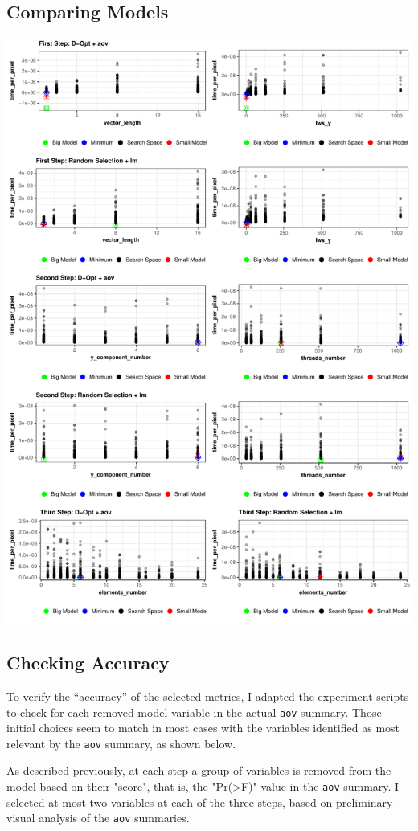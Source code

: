 \documentclass[final,12pt,a4paper]{article}
\begin{document}
\subsection{Comparing Models}
\label{sec:org64c6ae3}
\begin{center}
\includegraphics[width=.9\linewidth]{../img/model_comparison.pdf}
\end{center}
\subsection{Checking Accuracy}
\label{sec:orgc01bc39}
To verify the ``accuracy'' of the selected metrics, I adapted the experiment
scripts to check for each removed model variable in the actual \texttt{aov} summary.
Those initial choices seem to match in most cases with the variables identified
as most relevant by the \texttt{aov} summary, as shown below.

As described previously, at each step a group of variables is removed from the
model based on their "score", that is, the "Pr(>F)" value in the \texttt{aov} summary.
I selected at most two variables at each of the three steps, based on preliminary
visual analysis of the \texttt{aov} summaries.
\end{document}
